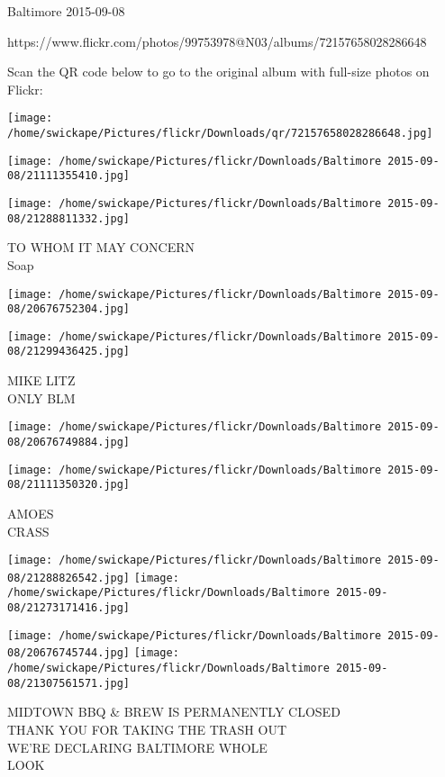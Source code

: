 \documentclass[10pt,letterpaper]{article}
\begin{document}
Baltimore 2015-09-08

https://www.flickr.com/photos/99753978@N03/albums/72157658028286648

Scan the QR code below to go to the original album with full-size photos on Flickr:

\texttt{[image: /home/swickape/Pictures/flickr/Downloads/qr/72157658028286648.jpg]}
\pagebreak

\texttt{[image: /home/swickape/Pictures/flickr/Downloads/Baltimore 2015-09-08/21111355410.jpg]}

\vspace{0.25in}
\texttt{[image: /home/swickape/Pictures/flickr/Downloads/Baltimore 2015-09-08/21288811332.jpg]}

TO WHOM IT MAY CONCERN\\
Soap\\
\pagebreak

\texttt{[image: /home/swickape/Pictures/flickr/Downloads/Baltimore 2015-09-08/20676752304.jpg]}

\vspace{0.25in}
\texttt{[image: /home/swickape/Pictures/flickr/Downloads/Baltimore 2015-09-08/21299436425.jpg]}

MIKE LITZ\\
ONLY BLM\\
\pagebreak

\texttt{[image: /home/swickape/Pictures/flickr/Downloads/Baltimore 2015-09-08/20676749884.jpg]}

\vspace{0.25in}
\texttt{[image: /home/swickape/Pictures/flickr/Downloads/Baltimore 2015-09-08/21111350320.jpg]}

AMOES\\
CRASS\\
\pagebreak

\texttt{[image: /home/swickape/Pictures/flickr/Downloads/Baltimore 2015-09-08/21288826542.jpg]}
\texttt{[image: /home/swickape/Pictures/flickr/Downloads/Baltimore 2015-09-08/21273171416.jpg]}

\texttt{[image: /home/swickape/Pictures/flickr/Downloads/Baltimore 2015-09-08/20676745744.jpg]}
\texttt{[image: /home/swickape/Pictures/flickr/Downloads/Baltimore 2015-09-08/21307561571.jpg]}

MIDTOWN BBQ \& BREW IS PERMANENTLY CLOSED\\
THANK YOU FOR TAKING THE TRASH OUT\\
WE'RE DECLARING BALTIMORE WHOLE\\
LOOK\\
\pagebreak
\end{document}
